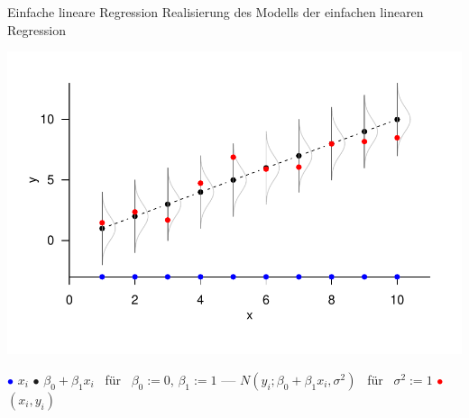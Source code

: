 \documentclass[
  8pt,
  ignorenonframetext,
]{beamer}
\begin{document}
\begin{frame}{Einfache lineare Regression}
\protect\hypertarget{einfache-lineare-regression-5}{}
Realisierung des Modells der einfachen linearen Regression \vspace{1mm}

\begin{center}\includegraphics[width=0.85\linewidth]{1_Abbildungen/alm_1_elr_2} \end{center}
\vspace{-4mm}
\footnotesize
\center

\textcolor{blue}{$\bullet$} \(x_i\) \hspace{2mm} \(\bullet\)
\(\beta_0 + \beta_1x_i\) \mbox{ für } \(\beta_0 := 0\), \(\beta_1 := 1\)
\hspace{2mm} \textcolor{gray}{\textbf{---}}
\(N(y_i; \beta_0 + \beta_1x_i, \sigma^2)\) \mbox{ für }
\(\sigma^2 := 1\) \hspace{2mm} \textcolor{red}{$\bullet$} \((x_i,y_i)\)
\end{frame}
\end{document}
